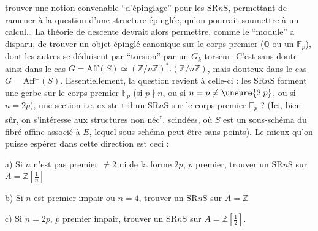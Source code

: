trouver une notion convenable  ``d'\uline{épinglage}''
pour les $\mathrm{SR}n\mathrm{S}$, permettant de  ramener
à la question d'une structure épinglée, qu'on
pourrait soumettre à un calcul\ldots{} La théorie
de descente devrait alors permettre, 
 comme le ``module'' a disparu,
de  trouver un objet épinglé
canonique sur le corps premier ($\mathbb{Q}$ ou
un $\mathbb{F}_p$), dont les autres se déduisent
par ``torsion'' par un  $G_k$-torseur.
C'est sans doute ainsi dans le cas  $G=\mathrm{Aff}(S)\simeq
(\mathbb{Z}/n\mathbb{Z})^*.(\mathbb{Z}/n\mathbb{Z})$, mais douteux dans le
cas $G=\mathrm{Aff}^{\pm}(S)$. Essentiellement, la question
revient à celle-ci : les $\mathrm{SR}n\mathrm{S}$  forment
une gerbe sur le corps premier $\mathbb{F}_p$
(si  $p\nmid n$, ou si $n=p\ne\unsure{2|p}$,  ou si
$n=2p$),   une \uline{section} i.e.
existe-t-il un $\mathrm{SR}n\mathrm{S}$ sur le corps
premier $\mathbb{F}_p$ ? (Ici, bien sûr, on s'intéresse
aux structures non néc\textsuperscript{t}. scindées, où
 $S$ est un sous-schéma du fibré affine
associé à $E$, lequel sous-schéma peut
être sans points). Le mieux qu'on
puisse espérer dans cette direction est ceci :

a) Si $n$  n'est pas premier $\ne 2$ ni de la forme $2p$,
$p$ premier, trouver un $\mathrm{SR}n\mathrm S$ sur $A=\mathbb Z[\frac1n]$

b) Si $n$ est premier impair ou $n=4$,
trouver un $\mathrm{SR}n\mathrm S$ sur $A=\mathbb Z$

c) Si $n=2p$, $p$ premier impair, trouver
un $\mathrm{SR}n\mathrm S$ sur $A=\mathbb Z[\frac12]$.

